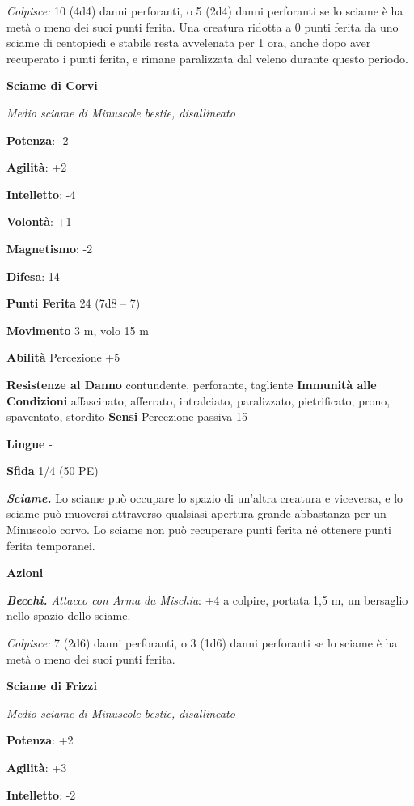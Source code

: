 \begin{multicols}{2}
\emph{Colpisce:} 10 (4d4) danni perforanti, o 5 (2d4) danni perforanti
se lo sciame è ha metà o meno dei suoi punti ferita. Una creatura
ridotta a 0 punti ferita da uno sciame di centopiedi e stabile resta
avvelenata per 1 ora, anche dopo aver recuperato i punti ferita, e
rimane paralizzata dal veleno durante questo periodo.

\textbf{Sciame di Corvi}

\emph{Medio sciame di Minuscole bestie, disallineato}

\textbf{Potenza}: -2

\textbf{Agilità}: +2

\textbf{Intelletto}: -4

\textbf{Volontà}: +1

\textbf{Magnetismo}: -2

\textbf{Difesa}: 14

\textbf{Punti Ferita} 24 (7d8 -- 7)

\textbf{Movimento} 3 m, volo 15 m

\textbf{Abilità} Percezione +5

\textbf{Resistenze al Danno} contundente, perforante, tagliente
\textbf{Immunità alle Condizioni} affascinato, afferrato, intralciato,
paralizzato, pietrificato, prono, spaventato, stordito \textbf{Sensi}
Percezione passiva 15

\textbf{Lingue} -

\textbf{Sfida} 1/4 (50 PE)

\emph{\textbf{Sciame.}} Lo sciame può occupare lo spazio di un'altra
creatura e viceversa, e lo sciame può muoversi attraverso qualsiasi
apertura grande abbastanza per un Minuscolo corvo. Lo sciame non può
recuperare punti ferita né ottenere punti ferita temporanei.

\textbf{Azioni}

\emph{\textbf{Becchi.} Attacco con Arma da Mischia}: +4 a colpire,
portata 1,5 m, un bersaglio nello spazio dello sciame.

\emph{Colpisce:} 7 (2d6) danni perforanti, o 3 (1d6) danni perforanti se
lo sciame è ha metà o meno dei suoi punti ferita.



\textbf{Sciame di Frizzi}

\emph{Medio sciame di Minuscole bestie, disallineato}

\textbf{Potenza}: +2

\textbf{Agilità}: +3

\textbf{Intelletto}: -2


\end{multicols}
